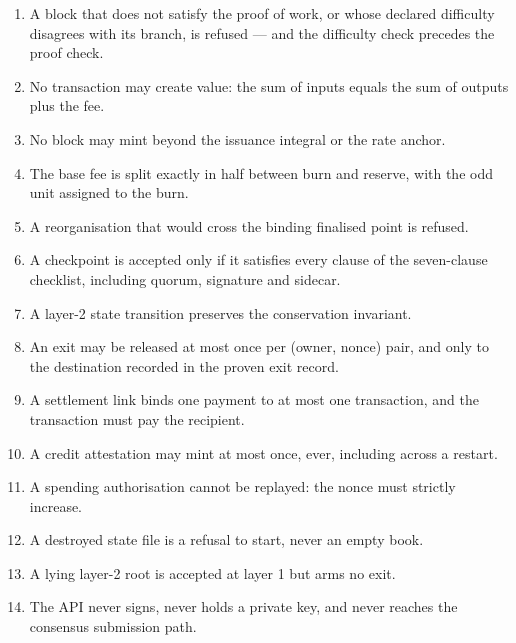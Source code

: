 \documentclass{article}
\begin{document}
\begin{enumerate}
\item A block that does not satisfy the proof of work, or whose declared
  difficulty disagrees with its branch, is refused --- and the difficulty
  check precedes the proof check.
\item No transaction may create value: the sum of inputs equals the sum of
  outputs plus the fee.
\item No block may mint beyond the issuance integral or the rate anchor.
\item The base fee is split exactly in half between burn and reserve, with the
  odd unit assigned to the burn.
\item A reorganisation that would cross the binding finalised point is refused.
\item A checkpoint is accepted only if it satisfies every clause of the
  seven-clause checklist, including quorum, signature and sidecar.
\item A layer-2 state transition preserves the conservation invariant.
\item An exit may be released at most once per (owner, nonce) pair, and only
  to the destination recorded in the proven exit record.
\item A settlement link binds one payment to at most one transaction, and the
  transaction must pay the recipient.
\item A credit attestation may mint at most once, ever, including across a
  restart.
\item A spending authorisation cannot be replayed: the nonce must strictly
  increase.
\item A destroyed state file is a refusal to start, never an empty book.
\item A lying layer-2 root is accepted at layer 1 but arms no exit.
\item The API never signs, never holds a private key, and never reaches the
  consensus submission path.
\end{enumerate}
\end{document}
